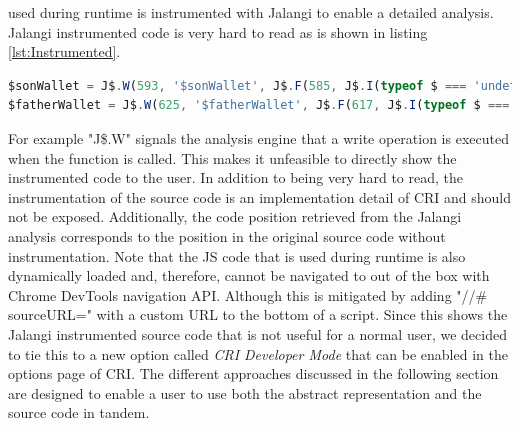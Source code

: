 used during runtime is instrumented with Jalangi to enable a detailed analysis. Jalangi instrumented code is very hard to read as is shown in listing \ref{lst:Instrumented}.

\begin{lstlisting}[language=JavaScript, caption={Example of RxJS code.},label={lst:Instrumented}]
$sonWallet = J$.W(593, '$sonWallet', J$.F(585, J$.I(typeof $ === 'undefined' ? $ = J$.R(569, '$', undefined, true, true) : $ = J$.R(569, '$', $, true, true)), false)(J$.T(577, '#wallet-son', 21, false)), J$.I(typeof $sonWallet === 'undefined' ? undefined : $sonWallet), true, true);
$fatherWallet = J$.W(625, '$fatherWallet', J$.F(617, J$.I(typeof $ === 'undefined' ? $ = J$.R(601, '$', undefined, true, true) : $ = J$.R(601, '$', $, true, true)), false)(J$.T(609, '#wallet-father', 21, false)), J$.I(typeof $fatherWallet === 'undefined' ? undefined : $fatherWallet), true, true);
\end{lstlisting}

For example "J\$.W" signals the analysis engine that a write operation is executed when the function is called. This makes it unfeasible to directly show the instrumented code to the user. In addition to being very hard to read, the instrumentation of the source code is an implementation detail of CRI and should not be exposed. Additionally, the code position retrieved from the Jalangi analysis corresponds to the position in the original source code without instrumentation. Note that the JS code that is used during runtime is also dynamically loaded and, therefore, cannot be navigated to out of the box with Chrome DevTools navigation API. Although this is mitigated by adding "//\# sourceURL=" with a custom URL to the bottom of a script. Since this shows the Jalangi instrumented source code that is not useful for a normal user, we decided to tie this to a new option called \emph{CRI Developer Mode} that can be enabled in the options page of CRI. The different approaches discussed in the following section are designed to enable a user to use both the abstract representation and the source code in tandem.
	
